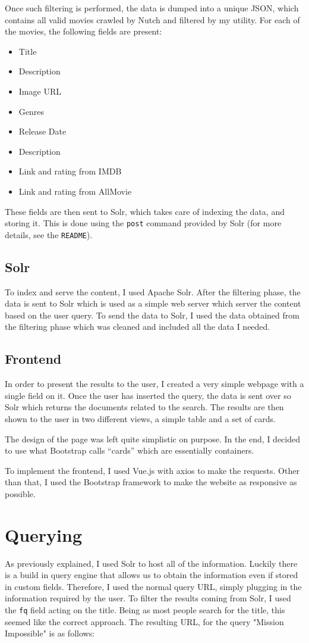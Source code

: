 \documentclass[a4paper]{article}
\begin{document}
Once such filtering is performed, the data is dumped into a unique JSON, which contains all valid movies crawled by Nutch and filtered by my utility. For each of the movies, the following fields are present:
\begin{itemize}
\item Title
\item Description
\item Image URL
\item Genres
\item Release Date
\item Description
\item Link and rating from IMDB
\item Link and rating from AllMovie

\end{itemize}
These fields are then sent to Solr, which takes care of indexing the data, and storing it. This is done using the \texttt{post} command provided by Solr (for more details, see the \texttt{README}).
\subsection{Solr}
To index and serve the content, I used Apache Solr. After the filtering phase, the data is sent to Solr which is used as a simple web server which server the content based on the user query. To send the data to Solr, I used the data obtained from the filtering phase which was cleaned and included all the data I needed. 

\subsection{Frontend}
In order to present the results to the user, I created a very simple webpage with a single field on it. Once the user has inserted the query, the data is sent over so Solr which returns the documents related to the search. The results are then shown to the user in two different views, a simple table and a set of cards.

The design of the page was left quite simplistic on purpose. In the end, I decided to use what Bootstrap calls ``cards'' which are essentially containers. 

To implement the frontend, I used Vue.js with axios to make the requests. Other than that, I used the Bootstrap framework to make the website as responsive as possible.

\section{Querying}
As previously explained, I used Solr to host all of the information. Luckily there is a build in query engine that allows us to obtain the information even if stored in custom fields. Therefore, I used the normal query URL, simply plugging in the information required by the user. To filter the results coming from Solr, I used the \texttt{fq} field acting on the title. Being as most people search for the title, this seemed like the correct approach. The resulting URL, for the query "Mission Impossible" is as follows:
\end{document}

